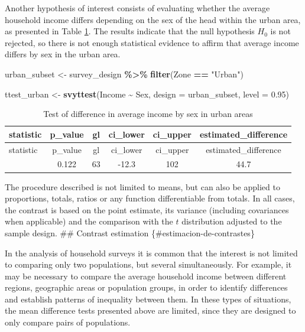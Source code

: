 \documentclass[
  english,
  12pt,
]{book}
\newenvironment{Shaded}{\begin{snugshade}}{\end{snugshade}}
\newcommand{\AttributeTok}[1]{\textcolor[rgb]{0.13,0.29,0.53}{#1}}
\newcommand{\FloatTok}[1]{\textcolor[rgb]{0.00,0.00,0.81}{#1}}
\newcommand{\FunctionTok}[1]{\textcolor[rgb]{0.13,0.29,0.53}{\textbf{#1}}}
\newcommand{\NormalTok}[1]{#1}
\newcommand{\OtherTok}[1]{\textcolor[rgb]{0.56,0.35,0.01}{#1}}
\newcommand{\SpecialCharTok}[1]{\textcolor[rgb]{0.81,0.36,0.00}{\textbf{#1}}}
\newcommand{\StringTok}[1]{\textcolor[rgb]{0.31,0.60,0.02}{#1}}
\begin{document}
Another hypothesis of interest consists of evaluating whether the average household income differs depending on the sex of the head within the urban area, as presented in Table \ref{tab:tab-ttest-sexo-urbano}. The results indicate that the null hypothesis \(H_0\) is not rejected, so there is not enough statistical evidence to affirm that average income differs by sex in the urban area.

\begin{Shaded}
\begin{Highlighting}[]
\NormalTok{urban\_subset }\OtherTok{\textless{}{-}}\NormalTok{ survey\_design }\SpecialCharTok{\%\textgreater{}\%}
  \FunctionTok{filter}\NormalTok{(Zone }\SpecialCharTok{==} \StringTok{"Urban"}\NormalTok{)}

\NormalTok{ttest\_urban }\OtherTok{\textless{}{-}} \FunctionTok{svyttest}\NormalTok{(Income }\SpecialCharTok{\textasciitilde{}}\NormalTok{ Sex, }\AttributeTok{design =}\NormalTok{ urban\_subset, }\AttributeTok{level =} \FloatTok{0.95}\NormalTok{)}
\end{Highlighting}
\end{Shaded}

\begin{longtable}[]{@{}lccccc@{}}
\caption{\label{tab:tab-ttest-sexo-urbano}Test of difference in average income by sex in urban areas}\tabularnewline
\toprule\noalign{}
statistic & p\_value & gl & ci\_lower & ci\_upper & estimated\_difference \\
\midrule\noalign{}
\endfirsthead
\toprule\noalign{}
statistic & p\_value & gl & ci\_lower & ci\_upper & estimated\_difference \\
\midrule\noalign{}
\endhead
\bottomrule\noalign{}
\endlastfoot
1.57 & 0.122 & 63 & -12.3 & 102 & 44.7 \\
\end{longtable}

The procedure described is not limited to means, but can also be applied to proportions, totals, ratios or any function differentiable from totals. In all cases, the contrast is based on the point estimate, its variance (including covariances when applicable) and the comparison with the \(t\) distribution adjusted to the sample design.
\#\# Contrast estimation \{\#estimacion-de-contrastes\}

In the analysis of household surveys it is common that the interest is not limited to comparing only two populations, but several simultaneously. For example, it may be necessary to compare the average household income between different regions, geographic areas or population groups, in order to identify differences and establish patterns of inequality between them. In these types of situations, the mean difference tests presented above are limited, since they are designed to only compare pairs of populations.
\end{document}
